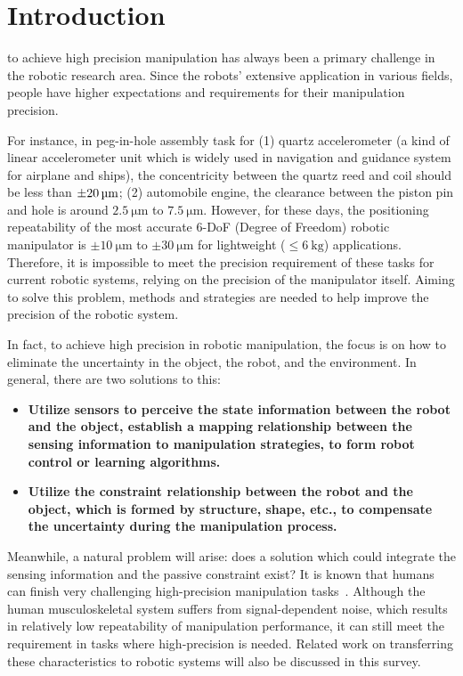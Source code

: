 \documentclass[journal,twoside,web]{ieeecolor}
\begin{document}
\section{Introduction}
\label{sec:intro}


 to achieve high precision manipulation has always been a primary challenge in the robotic research area. Since the robots’ extensive application in various fields, people have higher expectations and requirements for their manipulation precision.

For instance, in peg-in-hole assembly task for 
(1) quartz accelerometer (a kind of linear accelerometer unit which is widely used in navigation and guidance system for airplane and ships), the concentricity between the quartz reed and coil should be less than $\SI{\pm 20}{\micro\meter}$;
(2) automobile engine, the clearance between the piston pin and hole is around $\SI{2.5}{\micro\meter}$ to $\SI{7.5}{\micro\meter}$. 
However, for these days, the positioning repeatability of the most accurate 6-DoF (Degree of Freedom) robotic manipulator is $\pm\SI{10}{\micro\metre}$ to $\pm\SI{30}{\micro\metre}$ for lightweight ($\le\SI{6}{\kilogram}$) applications.
Therefore, it is impossible to meet the precision requirement of these tasks for current robotic systems, relying on the precision of the manipulator itself. 
Aiming to solve this problem, methods and strategies are needed to help improve the precision of the robotic system.

In fact, to achieve high precision in robotic manipulation, the focus is on how to eliminate the uncertainty in the object, the robot, and the environment. 
In general, there are two solutions to this:
\begin{itemize}
    \item \textbf{Utilize sensors to perceive the state information between the robot and the object, establish a mapping relationship between the sensing information to manipulation strategies, to form robot control or learning algorithms.}
        
    \item \textbf{Utilize the constraint relationship between the robot and the object, which is formed by structure, shape, etc., to compensate the uncertainty during the manipulation process.}
\end{itemize}

Meanwhile, a natural problem will arise: does a solution which could integrate the sensing information and the passive constraint exist? It is known that humans can finish very challenging high-precision manipulation tasks~\cite{Wu2015}. 
Although the human musculoskeletal system suffers from signal-dependent noise, which results in relatively low repeatability of manipulation performance, it can still meet the requirement in tasks where high-precision is needed. Related work on transferring these characteristics to robotic systems will also be discussed in this survey.
\end{document}
